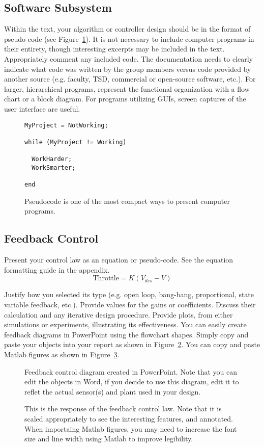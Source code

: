 \documentclass{wrcecapstone}
\begin{document}
\subsection{Software Subsystem}
Within the text, your algorithm or controller design should be in the format of pseudo-code (see Figure~\ref{f3}). It is not necessary to include computer programs in their entirety, though interesting excerpts may be included in the text. Appropriately comment any included code. The documentation needs to clearly indicate what code was written by the group members versus code provided by another source (e.g. faculty, TSD, commercial or open-source software, etc.).  For larger, hierarchical programs, represent the functional organization with a flow chart or a block diagram.  For programs utilizing GUIs, screen captures of the user interface are useful.   
\begin{figure}
\begin{lstlisting}
MyProject = NotWorking; 

while (MyProject != Working)

  WorkHarder;
  WorkSmarter;

end
\end{lstlisting}
\caption{Pseudocode is one of the most compact ways to present computer programs. %
}
\label{f3}
\end{figure}
  
\subsection{Feedback Control}
Present your control law as an equation or pseudo-code.   See the equation formatting guide in the appendix.  
\begin{equation}
\mbox{Throttle} = K (V_{des} - V)
\end{equation}

Justify how you selected its type (e.g.  open loop, bang-bang, proportional, state variable feedback, etc.). Provide values for the gains or coefficients.  Discuss their calculation and any iterative design procedure.  Provide plots, from either simulations or experiments, illustrating its effectiveness.  You can easily create feedback diagrams in PowerPoint using the flowchart shapes. Simply copy and paste your objects into your report as shown in Figure~\ref{f4}.   You can copy and paste Matlab figures as shown in Figure~\ref{f5}.
\begin{figure}
\caption{Feedback control diagram created in PowerPoint. Note that you can edit the objects in Word, if you decide to use this diagram, edit it to reflet the actual sensor(s) and plant used in your design.} 
\label{f4}
\end{figure}
\begin{figure}
\caption{This is the response of the feedback control law.   Note that it is scaled appropriately to see the interesting features, and annotated.   When importaing Matlab figures, you may need to increase the font size and line width using Matlab to improve legibility.}
\label{f5}
\end{figure}
\end{document}
